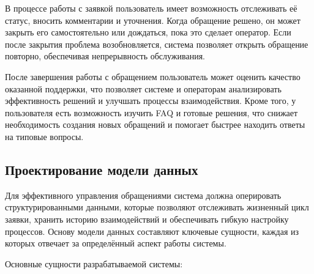 В процессе работы с заявкой пользователь имеет возможность отслеживать её статус, вносить комментарии и уточнения. Когда обращение решено, он может закрыть его самостоятельно или дождаться, пока это сделает оператор. Если после закрытия проблема возобновляется, система позволяет открыть обращение повторно, обеспечивая непрерывность обслуживания.

После завершения работы с обращением пользователь может оценить качество оказанной поддержки, что позволяет системе и операторам анализировать эффективность решений и улучшать процессы взаимодействия. Кроме того, у пользователя есть возможность изучить FAQ и готовые решения, что снижает необходимость создания новых обращений и помогает быстрее находить ответы на типовые вопросы.

\subsection{Проектирование модели данных}

Для эффективного управления обращениями система должна оперировать структурированными данными, которые позволяют отслеживать жизненный цикл заявки, хранить историю взаимодействий и обеспечивать гибкую настройку процессов. Основу модели данных составляют ключевые сущности, каждая из которых отвечает за определённый аспект работы системы.

Основные сущности разрабатываемой системы:

